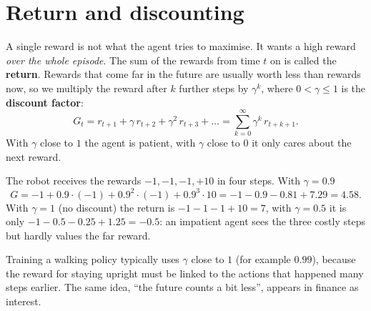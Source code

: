 \section*{Return and discounting}
A single reward is not what the agent tries to maximise. It wants a high reward \emph{over the whole episode}. The sum of the rewards from time $t$ on is called the \textbf{return}. Rewards that come far in the future are usually worth less than rewards now, so we multiply the reward after $k$ further steps by $\gamma^k$, where $0<\gamma\le1$ is the \textbf{discount factor}:
\[
G_t = r_{t+1}+\gamma\,r_{t+2}+\gamma^2\,r_{t+3}+\dots=\sum_{k=0}^{\infty}\gamma^k\,r_{t+k+1}.
\]
With $\gamma$ close to $1$ the agent is patient, with $\gamma$ close to $0$ it only cares about the next reward.

\begin{center}
\label{fig:rl1_gamma}
\end{center}

\begin{example}
The robot receives the rewards $-1,-1,-1,+10$ in four steps. With $\gamma=0.9$
\[
G=-1+0.9\cdot(-1)+0.9^2\cdot(-1)+0.9^3\cdot 10=-1-0.9-0.81+7.29=4.58 .
\]
With $\gamma=1$ (no discount) the return is $-1-1-1+10=7$, with $\gamma=0.5$ it is only $-1-0.5-0.25+1.25=-0.5$: an impatient agent sees the three costly steps but hardly values the far reward.
\end{example}

\begin{aibox}
Training a walking policy typically uses $\gamma$ close to $1$ (for example $0.99$), because the reward for staying upright must be linked to the actions that happened many steps earlier. The same idea, ``the future counts a bit less'', appears in finance as interest.
\end{aibox}

